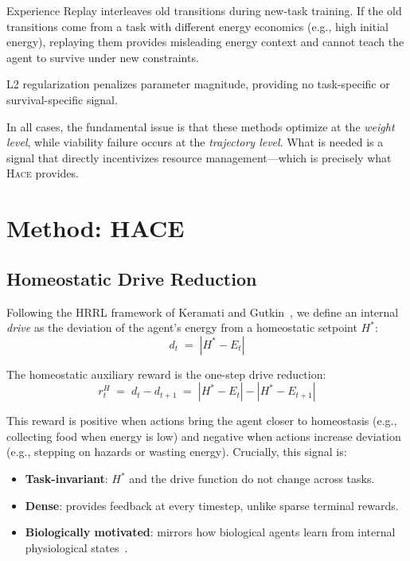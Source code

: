 \documentclass{article}
\newcommand{\setpoint}{H^*}
\newcommand{\energy}{E}
\newcommand{\drive}{d}
\newcommand{\reward}{r}
\newcommand{\hace}{\textsc{Hace}}
\begin{document}
Experience Replay interleaves old transitions during new-task training.
If the old transitions come from a task with different energy economics
(e.g., high initial energy), replaying them provides misleading energy
context and cannot teach the agent to survive under new constraints.

L2 regularization penalizes parameter magnitude, providing no
task-specific or survival-specific signal.

In all cases, the fundamental issue is that these methods optimize at the
\emph{weight level}, while viability failure occurs at the
\emph{trajectory level}. What is needed is a signal that directly
incentivizes resource management—which is precisely what \hace{} provides.

\section{Method: HACE}
\label{sec:hace}

\subsection{Homeostatic Drive Reduction}

Following the HRRL framework of Keramati and Gutkin~\cite{keramati2014},
we define an internal \emph{drive} as the deviation of the agent's energy
from a homeostatic setpoint $\setpoint$:
\begin{equation}
  \drive_t \;=\; |\setpoint - \energy_t|
\end{equation}

The homeostatic auxiliary reward is the one-step drive reduction:
\begin{equation}
  \reward_t^H \;=\; \drive_t - \drive_{t+1}
  \;=\; |\setpoint - \energy_t| - |\setpoint - \energy_{t+1}|
  \label{eq:drive_reduction}
\end{equation}

This reward is positive when actions bring the agent closer to homeostasis
(e.g., collecting food when energy is low) and negative when actions
increase deviation (e.g., stepping on hazards or wasting energy). Crucially,
this signal is:

\begin{itemize}[leftmargin=*,topsep=1pt,itemsep=1pt]
  \item \textbf{Task-invariant}: $\setpoint$ and the drive function do
        not change across tasks.
  \item \textbf{Dense}: provides feedback at every timestep, unlike
        sparse terminal rewards.
  \item \textbf{Biologically motivated}: mirrors how biological agents
        learn from internal physiological
        states~\cite{keramati2014,yoshida2018,konidaris2006}.
\end{itemize}
\end{document}
